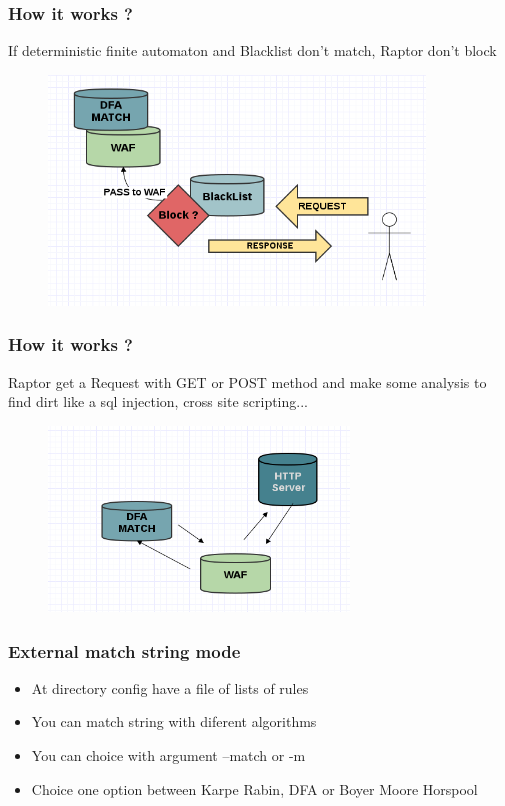 \documentclass[serif,mathserif]{beamer}
\begin{document}
\begin{frame}
  \frametitle{How it works ?}
  If deterministic finite automaton and Blacklist don't match, Raptor don't block 
  \begin{itemize} 
  \begin{figure}[]    
    \centering
    \includegraphics[width=10cm]{images/pass.png} 
  \end{figure}
  \end{itemize}
\end{frame}

\begin{frame}
  \frametitle{How it works ?}
  Raptor get a Request with GET or POST method and make some analysis to find dirt like a sql injection, cross site scripting...
  \begin{itemize} 
  \begin{figure}[]    
    \centering
    \includegraphics[width=8cm]{images/http.png} 
  \end{figure}
  \end{itemize}
\end{frame}

\begin{frame}
  \frametitle{External match string mode}
  \begin{itemize}
  \item At directory config have a file of lists of rules
  \item You can match string with diferent algorithms
  \item You can choice with argument --match or -m
  \item Choice one option between Karpe Rabin, DFA or Boyer Moore Horspool
  \end{itemize}
\end{frame}
\end{document}
